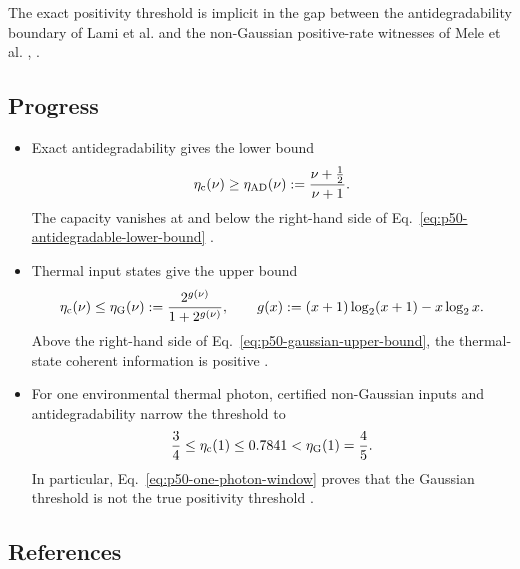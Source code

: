 The exact positivity threshold is implicit in the gap between the
antidegradability boundary of Lami et al. and the non-Gaussian positive-rate
witnesses of Mele et al. ,
.

\subsection*{Progress}

\begin{itemize}
  \item Exact antidegradability gives the lower bound
  \begin{equation}
    \eta_{\rm c}(\nu)\geq\eta_{\rm AD}(\nu)
    :=\frac{\nu+\frac12}{\nu+1}.
    \label{eq:p50-antidegradable-lower-bound}
  \end{equation}
  The capacity vanishes at and below the right-hand side of
  Eq.~\eqref{eq:p50-antidegradable-lower-bound}
  .

  \item Thermal input states give the upper bound
  \begin{equation}
    \eta_{\rm c}(\nu)\leq\eta_{\rm G}(\nu)
    :=\frac{2^{g(\nu)}}{1+2^{g(\nu)}},
    \qquad
    g(x):=(x+1)\log_2(x+1)-x\log_2x.
    \label{eq:p50-gaussian-upper-bound}
  \end{equation}
  Above the right-hand side of Eq.~\eqref{eq:p50-gaussian-upper-bound}, the
  thermal-state coherent information is positive
  .

  \item For one environmental thermal photon, certified non-Gaussian inputs
  and antidegradability narrow the threshold to
  \begin{equation}
    \frac34\leq\eta_{\rm c}(1)\leq0.7841
    <\eta_{\rm G}(1)=\frac45.
    \label{eq:p50-one-photon-window}
  \end{equation}
  In particular, Eq.~\eqref{eq:p50-one-photon-window} proves that the Gaussian
  threshold is not the true positivity threshold
  .
\end{itemize}

\subsection*{References}

